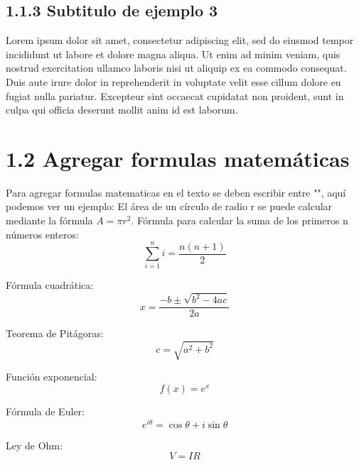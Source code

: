 \subsection{1.1.3 Subtitulo de ejemplo 3}

Lorem ipsum dolor sit amet, consectetur adipiscing elit, sed do eiusmod tempor incididunt ut labore et dolore magna aliqua. Ut enim ad minim veniam, quis nostrud exercitation ullamco laboris nisi ut aliquip ex ea commodo consequat. Duis aute irure dolor in reprehenderit in voluptate velit esse cillum dolore eu fugiat nulla pariatur. Excepteur sint occaecat cupidatat non proident, sunt in culpa qui officia deserunt mollit anim id est laborum.

\section{1.2 Agregar formulas matemáticas}

Para agregar formulas matematicas en el texto se deben escribir entre "$ $", aquí podemos ver un ejemplo: 
El área de un círculo de radio r se puede calcular mediante la fórmula $A = \pi r^2$.
Fórmula para calcular la suma de los primeros n números enteros:  
\begin{equation}
    \sum_{i=1}^{n} i = \frac{n(n+1)}{2}
\end{equation}

Fórmula cuadrática:
\begin{equation}
    x = \frac{-b \pm \sqrt{b^2 - 4ac}}{2a}
\end{equation}

Teorema de Pitágoras:
\begin{equation}
    c = \sqrt{a^2 + b^2}
\end{equation}

Función exponencial:
\begin{equation}
    f(x) = e^x
\end{equation}

Fórmula de Euler:
\begin{equation}
    e^{i\theta} = \cos\theta + i\sin\theta
\end{equation}

Ley de Ohm:
\begin{equation}
    V = IR
\end{equation}


